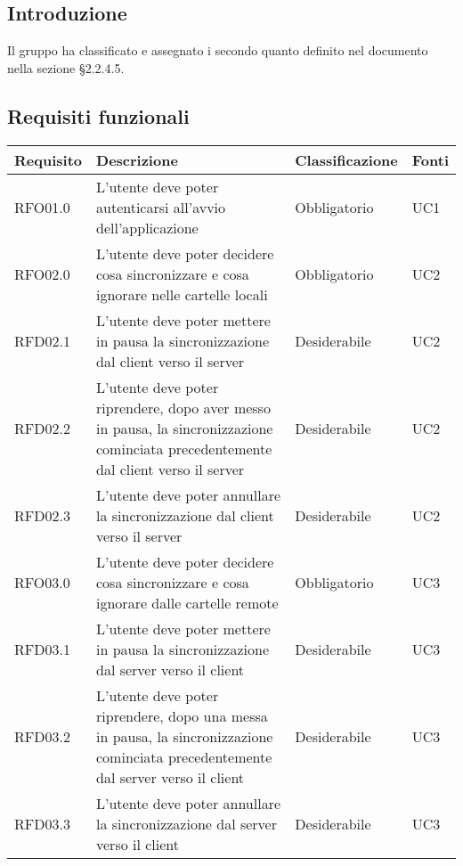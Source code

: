 \subsection{Introduzione}
Il gruppo \gruppo{} ha classificato e assegnato i  secondo quanto definito nel documento \NdP{} \versNdP{} nella sezione \S{}2.2.4.5.

\subsection{Requisiti funzionali}
{
    \setlength{\freewidth}{\dimexpr\textwidth-8\tabcolsep}
    \renewcommand{\arraystretch}{1.5}
    \centering
    \setlength{\aboverulesep}{0pt}
    \setlength{\belowrulesep}{0pt}
    \begin{longtable}{C{.20\freewidth} C{.40\freewidth} C{.20\freewidth} C{.20\freewidth}}
        \toprule
        \textbf{Requisito} & \textbf{Descrizione} & \textbf{Classificazione} & \textbf{Fonti} \\
        \toprule
        \endhead

        RFO01.0  & L'utente deve poter autenticarsi all'avvio dell'applicazione & Obbligatorio & UC1 \\

        RFO02.0  & L'utente deve poter decidere cosa sincronizzare e cosa ignorare nelle cartelle locali & Obbligatorio & UC2 \\
        RFD02.1  & L'utente deve poter mettere in pausa la sincronizzazione dal client verso il server & Desiderabile & UC2 \\
        RFD02.2  & L'utente deve poter riprendere, dopo aver messo in pausa, la sincronizzazione cominciata precedentemente dal client verso il server & Desiderabile & UC2 \\
        RFD02.3  & L'utente deve poter annullare la sincronizzazione dal client verso il server & Desiderabile & UC2 \\

        RFO03.0  & L'utente deve poter decidere cosa sincronizzare e cosa ignorare dalle cartelle remote & Obbligatorio & UC3 \\
        RFD03.1  & L'utente deve poter mettere in pausa la sincronizzazione dal server verso il client & Desiderabile & UC3 \\
        RFD03.2  & L'utente deve poter riprendere, dopo una messa in pausa, la sincronizzazione cominciata precedentemente dal server verso il client & Desiderabile & UC3 \\
        RFD03.3  & L'utente deve poter annullare la sincronizzazione dal server verso il client & Desiderabile & UC3 \\


\end{longtable}}

